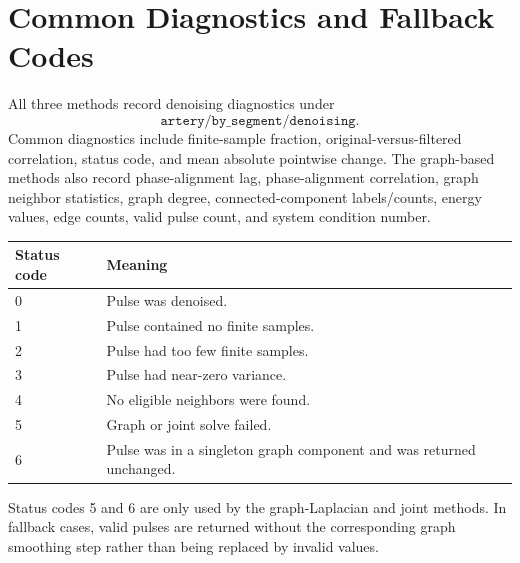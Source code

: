 \documentclass[11pt]{article}
\begin{document}
\section{Common Diagnostics and Fallback Codes}

All three methods record denoising diagnostics under
\[
    \texttt{artery/by\_segment/denoising}.
\]
Common diagnostics include finite-sample fraction, original-versus-filtered
correlation, status code, and mean absolute pointwise change.  The graph-based
methods also record phase-alignment lag, phase-alignment correlation, graph
neighbor statistics, graph degree, connected-component labels/counts, energy
values, edge counts, valid pulse count, and system condition number.

\begin{tabular}{@{}ll@{}}
\toprule
Status code & Meaning \\
\midrule
0 & Pulse was denoised. \\
1 & Pulse contained no finite samples. \\
2 & Pulse had too few finite samples. \\
3 & Pulse had near-zero variance. \\
4 & No eligible neighbors were found. \\
5 & Graph or joint solve failed. \\
6 & Pulse was in a singleton graph component and was returned unchanged. \\
\bottomrule
\end{tabular}

Status codes 5 and 6 are only used by the graph-Laplacian and joint methods.  In
fallback cases, valid pulses are returned without the corresponding graph
smoothing step rather than being replaced by invalid values.
\end{document}
